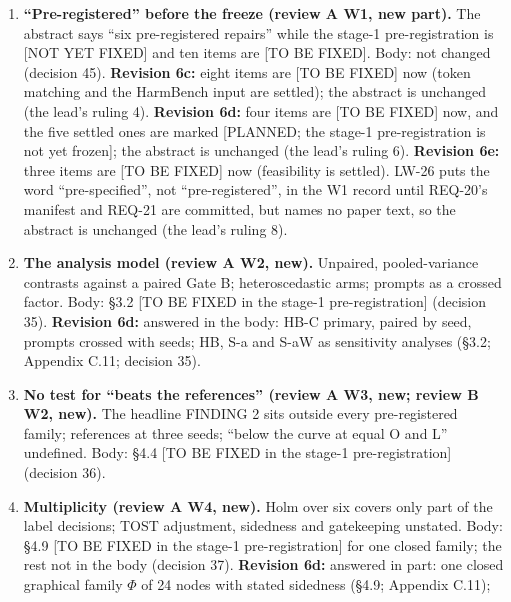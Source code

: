\documentclass{article}
\theoremstyle{plain}
\theoremstyle{definition}
\theoremstyle{remark}
\begin{document}
\begin{enumerate}
        The side paper covers the family $\times$ recipe and dose material, the
        opening layers and the blind read. Answer: the main paper cites it
        anonymously and reports none of its findings as new.
  \item \textbf{``Pre-registered'' before the freeze (review A W1, new part).}
        The abstract says ``six pre-registered repairs'' while the stage-1
        pre-registration is [NOT YET FIXED] and ten items are [TO BE FIXED].
        Body: not changed (decision 45). \textbf{Revision 6c:} eight items are
        [TO BE FIXED] now (token matching and the HarmBench input are settled);
        the abstract is unchanged (the lead's ruling 4). \textbf{Revision 6d:}
        four items are [TO BE FIXED] now, and the five settled ones are marked
        [PLANNED; the stage-1 pre-registration is not yet frozen]; the abstract
        is unchanged (the lead's ruling 6). \textbf{Revision 6e:} three items
        are [TO BE FIXED] now (feasibility is settled). LW-26 puts the word
        ``pre-specified'', not ``pre-registered'', in the W1 record until
        REQ-20's manifest and REQ-21 are committed, but names no paper text, so
        the abstract is unchanged (the lead's ruling 8).
  \item \textbf{The analysis model (review A W2, new).} Unpaired,
        pooled-variance contrasts against a paired Gate B; heteroscedastic arms;
        prompts as a crossed factor. Body: \S{}3.2 [TO BE FIXED in the stage-1
        pre-registration] (decision 35). \textbf{Revision 6d:} answered in the
        body: HB-C primary, paired by seed, prompts crossed with seeds; HB, S-a
        and S-aW as sensitivity analyses (\S{}3.2; Appendix C.11; decision 35).
  \item \textbf{No test for ``beats the references'' (review A W3, new; review B
        W2, new).} The headline FINDING 2 sits outside every pre-registered
        family; references at three seeds; ``below the curve at equal O and L''
        undefined. Body: \S{}4.4 [TO BE FIXED in the stage-1 pre-registration]
        (decision 36).
  \item \textbf{Multiplicity (review A W4, new).} Holm over six covers only part
        of the label decisions; TOST adjustment, sidedness and gatekeeping
        unstated. Body: \S{}4.9 [TO BE FIXED in the stage-1 pre-registration]
        for one closed family; the rest not in the body (decision 37).
        \textbf{Revision 6d:} answered in part: one closed graphical family
        $\Phi$ of 24 nodes with stated sidedness (\S{}4.9; Appendix C.11);

\end{enumerate}
\end{document}
